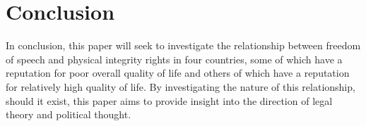\documentclass{article}
\begin{document}
\section{Conclusion}
In conclusion, this paper will seek to investigate the relationship between freedom of speech and physical integrity rights in four countries, some of which have a reputation for poor overall quality of life and others of which have a reputation for relatively high quality of life. By investigating the nature of this relationship, should it exist, this paper aims to provide insight into the direction of legal theory and political thought.
\end{document}
